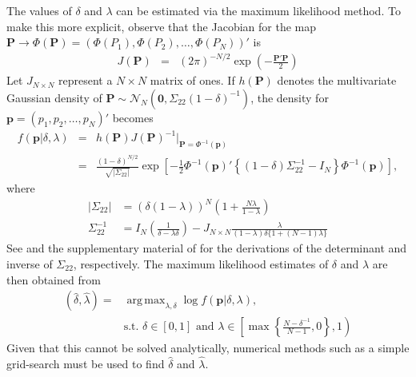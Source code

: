 \documentclass[11pt]{article}
\DeclareMathOperator*{\argmax}{arg\,max}
\theoremstyle{definition}
\theoremstyle{definition}
\begin{document}
The values of $\delta$ and $\lambda$ can be estimated via the maximum likelihood method. To make this more explicit, observe that the Jacobian for the map $\boldsymbol{P} \to \Phi\left(\boldsymbol{P}\right) = (\Phi(P_1), \Phi(P_2), \dots, \Phi(P_N))'$ is
\begin{eqnarray*}
J(\boldsymbol{P}) &=& (2\pi)^{-N/2} \exp \left( - \frac{\boldsymbol{P}' \boldsymbol{P}}{2}   \right) 
\end{eqnarray*}
%
Let $J_{N \times N}$ represent a $N\times N$ matrix of ones. If $h(\boldsymbol{P})$ denotes the multivariate Gaussian density of $\boldsymbol{P} \sim \mathcal{N}_N\left(\boldsymbol{0}, \Sigma_{22} (1-\delta)^{-1}\right)$,
the density for  $\boldsymbol{p} = (p_1, p_2, \dots, p_N)'$ becomes
\begin{eqnarray*}
 f\left(\boldsymbol{p} | \delta, \lambda \right) &=& h(\boldsymbol{P}) J(\boldsymbol{P})^{-1} \bigg|_{\boldsymbol{P} = \Phi^{-1}(\boldsymbol{p})}\\
&=& \frac{(1-\delta)^{N/2}}{\sqrt{ \left|\Sigma_{22}\right|}} \exp\left[ -\frac{1}{2} \Phi^{-1}(\boldsymbol{p})' \left\{ (1-\delta) \Sigma_{22}^{-1} - I_N \right\} \Phi^{-1}(\boldsymbol{p})  \right],
\end{eqnarray*}
where
\begin{align}
\left| \Sigma_{22}\right| &= (\delta(1- \lambda))^N \left(1+\frac{N \lambda}{1 - \lambda} \right) \nonumber\\
\Sigma_{22}^{-1} &= I_N \left(\frac{1}{\delta-\lambda\delta} \right) - J_{N \times N} \frac{\lambda}{(1-\lambda)\delta\{1+(N-1) \lambda\}} \label{inverse}
\end{align}
See \citet{rao2009linear} and the supplementary material of \citet{dobbin2005sample} for the derivations of the determinant and inverse of $\Sigma_{22}$, respectively. The maximum likelihood estimates of $\delta$ and $\lambda$ are then obtained from
\begin{align*}
\left(\hat{\delta}, \hat{\lambda}\right) =& \argmax_{\lambda, \delta} \log  f\left(\boldsymbol{p}| \delta, \lambda \right),\\
& \text{s.t. } \nonumber \delta \in [0,1] \text{ and } \lambda \in \left[  \max \left\{ \frac{N-\delta^{-1}}{N-1}, 0\right\}, 1 \right)
\end{align*}
Given that this cannot be solved analytically, numerical methods such as a simple grid-search must be used to find $\hat{\delta}$ and $\hat{\lambda}$. 

% 

%
%

\end{document}
